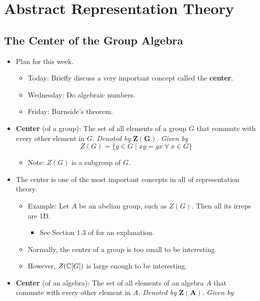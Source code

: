 \documentclass[../notes.tex]{subfiles}
\begin{document}
\chapter{Abstract Representation Theory}
\section{The Center of the Group Algebra}
\begin{itemize}
    \item {}Plan for this week.
    \begin{itemize}
        \item Today: Briefly discuss a very important concept called the \textbf{center}.
        \item Wednesday: Do algebraic numbers.
        \item Friday: Burnside's theorem.
    \end{itemize}
    \item \textbf{Center} (of a group): The set of all elements of a group $G$ that commute with every other element in $G$. \emph{Denoted by} $\bm{Z(G)}$. \emph{Given by}
    \begin{equation*}
        Z(G) = \{g\in G\mid xg=gx\ \forall\ x\in G\}
    \end{equation*}
    \begin{itemize}
        \item Note: $Z(G)$ is a subgroup of $G$.
    \end{itemize}
    \item The center is one of the most important concepts in all of representation theory.
    \begin{itemize}
        \item Example: Let $A$ be an abelian group, such as $Z(G)$. Then all its irreps are 1D.
        \begin{itemize}
            \item See Section 1.3 of \textcite{bib:FultonHarris} for an explanation.
        \end{itemize}
        \item Normally, the center of a group is too small to be interesting.
        \item However, $Z(\mathbb{C}[G])$ is large enough to be interesting.
    \end{itemize}
    \item \textbf{Center} (of an algebra): The set of all elements of an algebra $A$ that commute with every other element in $A$. \emph{Denoted by} $\bm{Z(A)}$. \emph{Given by}

\end{itemize}
\end{document}
